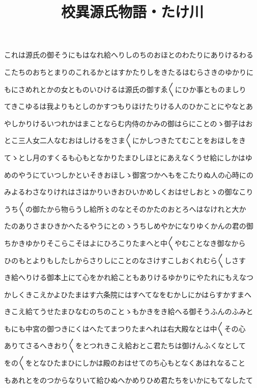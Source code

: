 \documentclass[a4paper,11pt,landscape]{ltjtarticle}
\title{校異源氏物語・たけ川}
\date{}
\begin{document}
\maketitle

これは源氏の御そうにもはなれ給へりしのちのおほとのわたりにありけるわる
\par\medskip
こたちのおちとまりのこれるかとはすかたりしをきたるはむらさきのゆかりに
\par\medskip
もにさめれとかの女とものいひけるは源氏の御すゑ〱にひか事とものましり
\par\medskip
てきこゆるは我よりもとしのかすつもりほけたりける人のひかことにやなとあ
\par\medskip
やしかりけるいつれかはまことならむ内侍のかみの御はらにことのゝ御子はお
\par\medskip
とこ三人女二人なむおはしけるをさま〱にかしつきたてむことをおほしをき
\par\medskip
てゝとし月のすくるも心もとなかりたまひしほとにあえなくうせ給にしかはゆ
\par\medskip
めのやうにていつしかといそきおほしゝ御宮つかへもをこたりぬ人の心時にの
\par\medskip
みよるわさなりけれはさはかりいきおひいかめしくおはせしおとゝの御なこり
\par\medskip
うち〱の御たから物らうし給所〻のなとそのかたのおとろへはなけれと大か
\par\medskip
たのありさまひきかへたるやうにとのゝうちしめやかになりゆくかんの君の御
\par\medskip
ちかきゆかりそこらこそはよにひろこりたまへと中〱やむことなき御なから
\par\medskip
ひのもとよりもしたしからさりしにことのなさけすこしおくれむら〱しさす
\par\medskip
き給へりける御本上にて心をかれ給こともありけるゆかりにやたれにもえなつ
\par\medskip
かしくきこえかよひたまはす六条院にはすへてなをむかしにかはらすかすまへ
\par\medskip
きこえ給てうせたまひなむのちのことゝもかきをき給へる御そうふんのふみと
\par\medskip
もにも中宮の御つきにくはへたてまつりたまへれは右大殿なとは中〱その心
\par\medskip
ありてさるへきおり〱をとつれきこえ給おとこ君たちは御けんふくなとして
\par\medskip
をの〱をとなひたまひにしかは殿のおはせてのち心もとなくあはれなること
\par\medskip
もあれとをのつからなりいて給ひぬへかめりひめ君たちをいかにもてなしたて
\end{document}
